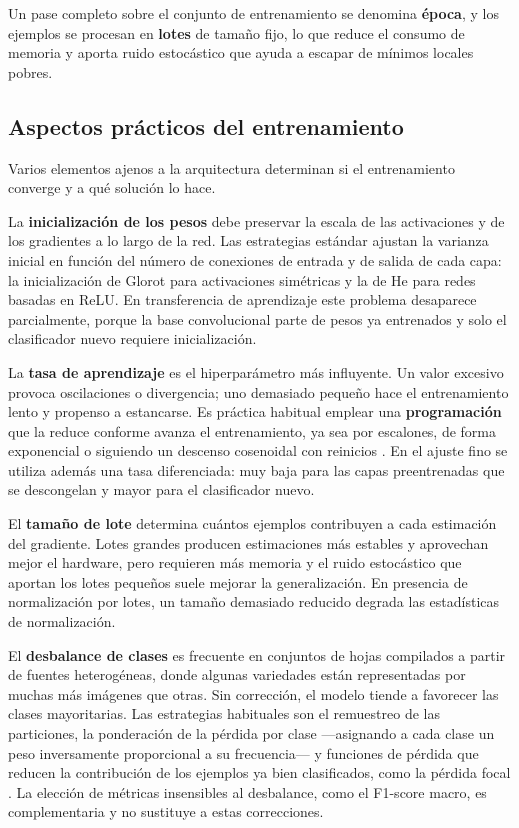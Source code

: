Un pase completo sobre el conjunto de entrenamiento se denomina
\textbf{época}, y los ejemplos se procesan en \textbf{lotes} de tamaño fijo,
lo que reduce el consumo de memoria y aporta ruido estocástico que ayuda a
escapar de mínimos locales pobres.

\subsection{Aspectos prácticos del entrenamiento}

Varios elementos ajenos a la arquitectura determinan si el entrenamiento
converge y a qué solución lo hace.

La \textbf{inicialización de los pesos} debe preservar la escala de las
activaciones y de los gradientes a lo largo de la red. Las estrategias
estándar ajustan la varianza inicial en función del número de conexiones de
entrada y de salida de cada capa: la inicialización de Glorot
\citep{glorot2010} para activaciones simétricas y la de He \citep{he2015}
para redes basadas en ReLU. En transferencia de aprendizaje este problema
desaparece parcialmente, porque la base convolucional parte de pesos ya
entrenados y solo el clasificador nuevo requiere inicialización.

La \textbf{tasa de aprendizaje} es el hiperparámetro más influyente. Un
valor excesivo provoca oscilaciones o divergencia; uno demasiado pequeño
hace el entrenamiento lento y propenso a estancarse. Es práctica habitual
emplear una \textbf{programación} que la reduce conforme avanza el
entrenamiento, ya sea por escalones, de forma exponencial o siguiendo un
descenso cosenoidal con reinicios \citep{loshchilov2017}. En el ajuste fino
se utiliza además una tasa diferenciada: muy baja para las capas
preentrenadas que se descongelan y mayor para el clasificador nuevo.

El \textbf{tamaño de lote} determina cuántos ejemplos contribuyen a cada
estimación del gradiente. Lotes grandes producen estimaciones más estables y
aprovechan mejor el hardware, pero requieren más memoria y el ruido
estocástico que aportan los lotes pequeños suele mejorar la generalización.
En presencia de normalización por lotes, un tamaño demasiado reducido
degrada las estadísticas de normalización.

El \textbf{desbalance de clases} es frecuente en conjuntos de hojas
compilados a partir de fuentes heterogéneas, donde algunas variedades están
representadas por muchas más imágenes que otras. Sin corrección, el modelo
tiende a favorecer las clases mayoritarias. Las estrategias habituales son
el remuestreo de las particiones, la ponderación de la pérdida por clase
—asignando a cada clase un peso inversamente proporcional a su frecuencia—
y funciones de pérdida que reducen la contribución de los ejemplos ya bien
clasificados, como la pérdida focal \citep{lin2017}. La elección de métricas
insensibles al desbalance, como el F1-score macro, es complementaria y no
sustituye a estas correcciones.

